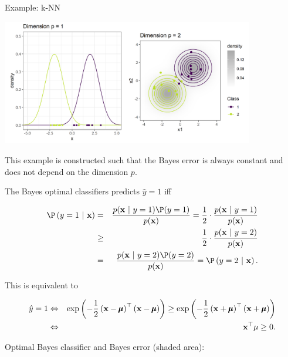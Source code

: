\documentclass[11pt,compress,t,notes=noshow, xcolor=table]{beamer}
\begin{document}
\begin{vbframe}{Example: k-NN}
\framebreak 

\begin{center}
\includegraphics[width = 11cm]{figure/knn_density_plot.png}
\end{center}

\framebreak 
This example is constructed such that the Bayes error is always constant and does not depend on the dimension $p$. 

\lz 

The Bayes optimal classifiers predicts $\hat y = 1$ iff

\begin{footnotesize}
  \begin{eqnarray*}
  \P\left(y = 1 ~|~ \xv\right) &=& \frac{p(\xv ~|~y = 1)\P(y = 1)}{p(\xv)} = \frac{1}{2} \cdot \frac{p(\xv ~|~y = 1)}{p(\xv)}\\
  &\ge& \frac{1}{2} \cdot \frac{p(\xv ~|~y = 2)}{p(\xv)} \\ &=& \frac{p(\xv ~|~y = 2)\P(y = 2)}{p(\xv)} = \P\left(y = 2 ~|~ \xv\right). 
  \end{eqnarray*}
\end{footnotesize}

This is equivalent to 

\vspace*{-0.5cm}

\begin{footnotesize}
  \begin{eqnarray*}
  \hat y = 1 &\Leftrightarrow& \exp\left(-\frac{1}{2} \left(\mathbf{x} - \pmb\mu\right)^\top \left(\mathbf{x} - \pmb\mu\right)\right) \ge \exp\left(-\frac{1}{2} \left(\mathbf{x} + \pmb\mu\right)^\top \left(\mathbf{x} + \pmb\mu\right)\right) \\
  &\Leftrightarrow& \mathbf{x}^\top \mu \ge 0. 
  \end{eqnarray*}
\end{footnotesize}

\framebreak

Optimal Bayes classifier and Bayes error (shaded area):


\end{vbframe}
\end{document}
